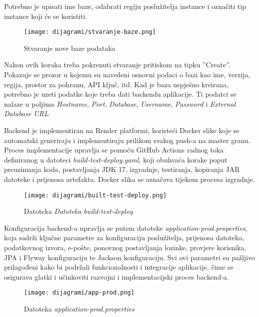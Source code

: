 Potrebno je upisati ime baze, odabrati regiju poslužitelja instance i označiti tip instance koji će se koristiti.

\begin{figure}[H]
	\texttt{[image: dijagrami/stvaranje-baze.png]}
	\centering
	\caption{Stvaranje nove baze podataka}
	\label{fig:tvaranje-baze}
\end{figure}



Nakon ovih koraka treba pokrenuti stvaranje pritiskom na tipku ”Create”.
Pokazuje se prozor u kojemu su navedeni osnovni podaci o bazi kao ime, verzija, regija, prostor za pohranu, API ključ, itd.
Kad je baza uspješno kreirana, potrebno je uzeti podatke koje treba dati backendu aplikacije. Ti podatci se nalaze u poljima \textit{Hostname}, \textit{Port}, \textit{Database}, \textit{Username}, \textit{Password} i \textit{External Database URL}.



Backend je implementiran na Render platformi, koristeći Docker slike koje se automatski generiraju i implementiraju prilikom svakog push-a na master granu. Proces implementacije upravlja se pomoću GitHub Actions radnog toka definiranog u datoteci \textit{build-test-deploy.yaml}, koji obuhvaća korake poput preuzimanja koda, postavljanja JDK 17, izgradnje, testiranja, kopiranja JAR datoteke i prijenosa artefakta. Docker slika se označava tijekom procesa izgradnje. 

\begin{figure}[H]
	\texttt{[image: dijagrami/built-test-deploy.png]}
	\centering
	\caption{Datoteka \textit{Datoteka build-test-deploy}}
	\label{fig:built-test-deploy}
\end{figure}



Konfiguracija backend-a upravlja se putem datoteke \textit{application-prod.properties}, koja sadrži ključne parametre za konfiguraciju poslužitelja, prijenosa datoteka, podatkovnog izvora, e-pošte, ponovnog postavljanja lozinke, provjere korisnika, JPA i Flyway konfiguraciju te Jackson konfiguraciju. Svi ovi parametri su pažljivo prilagođeni kako bi podržali funkcionalnosti i integracije aplikacije, čime se osigurava glatki i učinkoviti razvojni i implementacijski proces backend-a.

\begin{figure}[H]
	\texttt{[image: dijagrami/app-prod.png]}
	\centering
	\caption{Datoteka \textit{application-prod.properties}}
	\label{fig:app-prod}
\end{figure}



